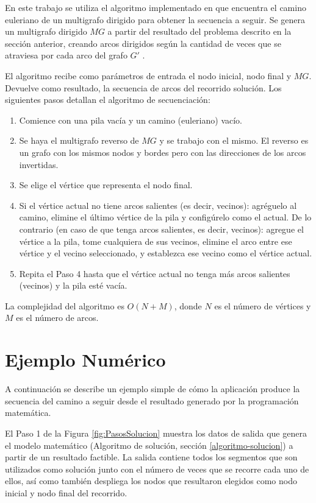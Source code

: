 En este trabajo se utiliza el algoritmo implementado en \cite{RiveraHazim2015APath} que encuentra el camino euleriano de un multigrafo dirigido para obtener la secuencia a seguir. Se genera un multigrafo dirigido $MG$ a partir del resultado del problema descrito en la sección anterior, creando arcos dirigidos según la cantidad de veces que se atraviesa por cada arco del grafo $G'$ . 

El algoritmo recibe como parámetros de entrada el nodo inicial, nodo final y $MG$. Devuelve como resultado, la secuencia de arcos del recorrido solución. Los siguientes pasos detallan el algoritmo de secuenciación:

\begin{enumerate}
    \item Comience con una pila vacía y un camino (euleriano) vacío. 
    \item Se haya el multigrafo reverso de $MG$ y se trabajo con el mismo. El reverso es un grafo con los mismos nodos y bordes pero con las direcciones de los arcos invertidas.
    \item Se elige el vértice que representa el nodo final.
    \item Si el vértice actual no tiene arcos salientes (es decir, vecinos): agréguelo al camino, elimine el último vértice de la pila y configúrelo como el actual. De lo contrario (en caso de que tenga arcos salientes, es decir, vecinos): agregue el vértice a la pila, tome cualquiera de sus vecinos, elimine el arco entre ese vértice y el vecino seleccionado, y establezca ese vecino como el vértice actual.
    \item Repita el Paso 4 hasta que el vértice actual no tenga más arcos salientes (vecinos) y la pila esté vacía.
\end{enumerate}

La complejidad del algoritmo es $O(N + M)$, donde $N$ es el número de vértices y $M$ es el número de arcos.

\section{Ejemplo Numérico}
A continuación se describe un ejemplo simple de cómo la aplicación produce la secuencia del camino a seguir desde el resultado generado por la programación matemática.

El Paso 1 de la Figura \ref{fig:PasosSolucion} muestra los datos de salida que genera el modelo matemático (Algoritmo  de  solución, sección \ref{algoritmo-solucion}) a partir de un resultado factible. La salida contiene todos los segmentos que son utilizados como solución junto con el número de veces que se recorre cada uno de ellos, así como también despliega los nodos que resultaron elegidos como nodo inicial y nodo final del recorrido. 


